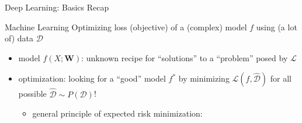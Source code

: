 \begin{frame}{Deep Learning: Basics Recap}
\protect\hypertarget{deep-learning-basics-recap-1}{}
\begin{block}{Machine Learning}
\protect\hypertarget{machine-learning-1}{}
Optimizing loss (objective) of a (complex) model \(f\) using (a lot of)
data \(\mathcal{D}\)
\end{block}

\begin{itemize}
\tightlist
\item
  model \(f(X;\mathbf{W})\): unknown recipe for ``solutions'' to a
  ``problem'' posed by \(\mathcal{L}\)
\item
  optimization: looking for a ``good'' model \(f^{*}\) by minimizing
  \(\mathcal{L}(f,\mathcal{\hat{D}})\) for all possible
  \(\mathcal{\hat{D}} \sim P(\mathcal{D})\)!

  \begin{itemize}
  \tightlist
  \item
    general principle of expected risk minimization:
  \end{itemize}

\end{itemize}

\end{frame}

